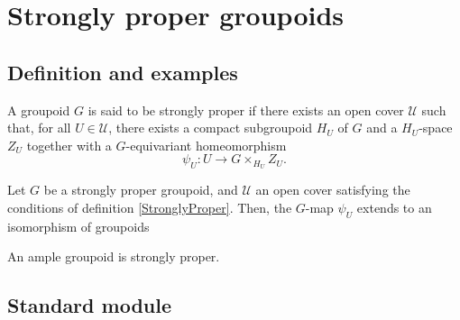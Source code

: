 \section{Strongly proper groupoids}

\subsection{Definition and examples}
\begin{definition}\label{StronglyProper}
A groupoid $G$ is said to be strongly proper if there exists an open cover $\mathcal U$ such that, for all $U\in\mathcal U$, there exists a compact subgroupoid $H_U$ of $G$ and a $H_U$-space $Z_U$ together with a $G$-equivariant homeomorphism
\[\psi_U : U \rightarrow G\times_{H_U} Z_U.\] 
\end{definition}

\begin{prop}
Let $G$ be a strongly proper groupoid, and $\mathcal U$ an open cover satisfying the conditions of definition \ref{StronglyProper}. Then, the $G$-map $\psi_U $ extends to an isomorphism of groupoids
\end{prop}

An ample groupoid is strongly proper.

\subsection{Standard module}





